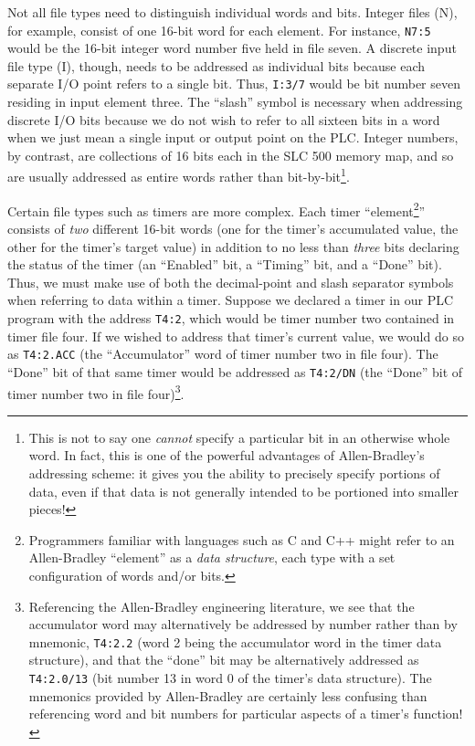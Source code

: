 Not all file types need to distinguish individual words and bits.  Integer files (N), for example, consist of one 16-bit word for each element.  For instance, \texttt{N7:5} would be the 16-bit integer word number five held in file seven.  A discrete input file type (I), though, needs to be addressed as individual bits because each separate I/O point refers to a single bit.  Thus, \texttt{I:3/7} would be bit number seven residing in input element three.  The ``slash'' symbol is necessary when addressing discrete I/O bits because we do not wish to refer to all sixteen bits in a word when we just mean a single input or output point on the PLC.  Integer numbers, by contrast, are collections of 16 bits each in the SLC 500 memory map, and so are usually addressed as entire words rather than bit-by-bit\footnote{This is not to say one \textit{cannot} specify a particular bit in an otherwise whole word.  In fact, this is one of the powerful advantages of Allen-Bradley's addressing scheme: it gives you the ability to precisely specify portions of data, even if that data is not generally intended to be portioned into smaller pieces!}.

Certain file types such as timers are more complex.  Each timer ``element\footnote{Programmers familiar with languages such as C and C++ might refer to an Allen-Bradley ``element'' as a \textit{data structure}, each type with a set configuration of words and/or bits.}'' consists of \textit{two} different 16-bit words (one for the timer's accumulated value, the other for the timer's target value) in addition to no less than \textit{three} bits declaring the status of the timer (an ``Enabled'' bit, a ``Timing'' bit, and a ``Done'' bit).  Thus, we must make use of both the decimal-point and slash separator symbols when referring to data within a timer.  Suppose we declared a timer in our PLC program with the address \texttt{T4:2}, which would be timer number two contained in timer file four.  If we wished to address that timer's current value, we would do so as \texttt{T4:2.ACC} (the ``Accumulator'' word of timer number two in file four).  The ``Done'' bit of that same timer would be addressed as \texttt{T4:2/DN} (the ``Done'' bit of timer number two in file four)\footnote{Referencing the Allen-Bradley engineering literature, we see that the accumulator word may alternatively be addressed by number rather than by mnemonic, \texttt{T4:2.2} (word 2 being the accumulator word in the timer data structure), and that the ``done'' bit may be alternatively addressed as \texttt{T4:2.0/13} (bit number 13 in word 0 of the timer's data structure).  The mnemonics provided by Allen-Bradley are certainly less confusing than referencing word and bit numbers for particular aspects of a timer's function!}.

